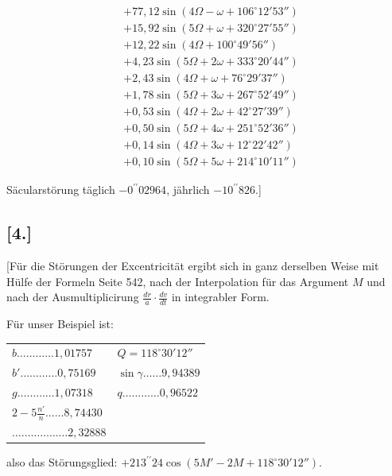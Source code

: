 \documentclass[10pt,a4paper]{article}
\begin{document}
\begin{align*}
&+ 77,12 \sin(4\Omega - \omega + 106^{\circ}12'53'') \\
&+ 15,92 \sin(5\Omega + \omega + 320^{\circ}27'55'') \\
&+ 12,22 \sin(4\Omega + 100^{\circ}49'56'') \\
&+ 4,23 \sin(5\Omega + 2\omega + 333^{\circ}20'44'') \\
&+ 2,43 \sin(4\Omega + \omega + 76^{\circ}29'37'') \\
&+ 1,78 \sin(5\Omega + 3\omega + 267^{\circ}52'49'') \\
&+ 0,53 \sin(4\Omega + 2\omega + 42^{\circ}27'39'') \\
&+ 0,50 \sin(5\Omega + 4\omega + 251^{\circ}52'36'') \\
&+ 0,14 \sin(4\Omega + 3\omega + 12^{\circ}22'42'') \\
&+ 0,10 \sin(5\Omega + 5\omega + 214^{\circ}10'11'')
\end{align*}

Säcularstörung täglich $-0^{\prime\prime}02964$, jährlich $-10^{\prime\prime}826$.]

\newpage
\subsection*{[4.]}

[Für die Störungen der Excentricität ergibt sich in ganz derselben Weise mit Hülfe der Formeln 
Seite 542, nach der Interpolation für das Argument $M$ und nach der Ausmultiplicirung 
$\frac{dr}{a} \cdot \frac{dv}{dt}$ in integrabler Form.

Für unser Beispiel ist:

\begin{center}
\begin{tabular}{ll}
$b \ldots\ldots\ldots\ldots 1,01757$ & $Q = 118^{\circ}30'12''$ \\
$b' \ldots\ldots\ldots\ldots 0,75169$ & $\sin \gamma \ldots\ldots 9,94389$ \\
$g \ldots\ldots\ldots\ldots 1,07318$ & $q \ldots\ldots\ldots\ldots 0,96522$ \\
$2 - 5\frac{n'}{n} \ldots\ldots 8,74430$ & \\
$\ldots\ldots\ldots\ldots\ldots\ldots 2,32888$ & 
\end{tabular}
\end{center}

also das Störungsglied: $+ 213^{\prime\prime}24 \cos(5M' - 2M + 118^{\circ}30'12'')$.
\end{document}
